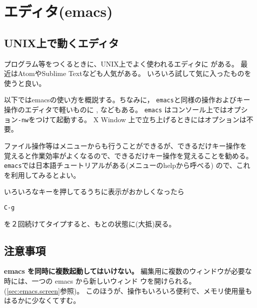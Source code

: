 \documentclass{jreport}
\begin{document}


\chapter{エディタ(emacs)}

\section{UNIX上で動くエディタ}
プログラム等をつくるときに、UNIX上でよく使われるエディタに
がある。
最近はAtomやSublime Textなども人気がある。
いろいろ試して気に入ったものを使うと良い。

以下ではemacsの使い方を概説する。ちなみに，
\verb|emacs|と同様の操作およびキー操作のエディタで軽いものに
, などもある。
\verb|emacs| はコンソール上ではオプション\verb|-nw|をつけて起動する。
X Window 上で立ち上げるときにはオプションは不要。

ファイル操作等はメニューからも行うことができるが、できるだけキー操作を
覚えると作業効率がよくなるので、できるだけキー操作を覚えることを勧める。
\verb|emacs|では日本語チュートリアルがある(メニューのhelpから呼べる)
ので、これを利用してみるとよい。

いろいろなキーを押してるうちに表示がおかしくなったら
\begin{screen}
\begin{verbatim}
C-g
\end{verbatim}
\end{screen}
を２回続けてタイプすると、もとの状態に(大抵)戻る。

\section{注意事項}

\textbf{emacs を同時に複数起動してはいけない。}
編集用に複数のウィンドウが必要な時には、一つの emacs から新しいウィンド
ウを開けられる。
(\ref{sec:emacs.screen}参照)。
このほうが、操作もいろいろ便利で、メモリ使用量もはるかに少なくてすむ。
\end{document}

